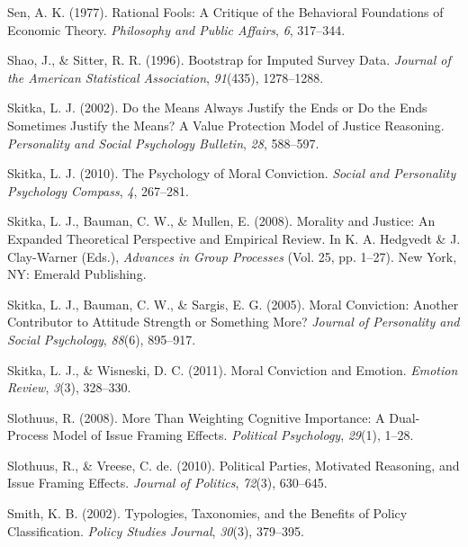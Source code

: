 \documentclass[12pt,econ]{sources/authesis}
\begin{document}
\leavevmode\hypertarget{ref-sen_rational_1977}{}%
Sen, A. K. (1977). Rational Fools: A Critique of the Behavioral Foundations of Economic Theory. \emph{Philosophy and Public Affairs}, \emph{6}, 317--344.

\leavevmode\hypertarget{ref-shao_1996_bootstrap}{}%
Shao, J., \& Sitter, R. R. (1996). Bootstrap for Imputed Survey Data. \emph{Journal of the American Statistical Association}, \emph{91}(435), 1278--1288.

\leavevmode\hypertarget{ref-skitka_2002_means}{}%
Skitka, L. J. (2002). Do the Means Always Justify the Ends or Do the Ends Sometimes Justify the Means? A Value Protection Model of Justice Reasoning. \emph{Personality and Social Psychology Bulletin}, \emph{28}, 588--597.

\leavevmode\hypertarget{ref-skitka_psychology_2010}{}%
Skitka, L. J. (2010). The Psychology of Moral Conviction. \emph{Social and Personality Psychology Compass}, \emph{4}, 267--281.

\leavevmode\hypertarget{ref-skitka_2008_morality}{}%
Skitka, L. J., Bauman, C. W., \& Mullen, E. (2008). Morality and Justice: An Expanded Theoretical Perspective and Empirical Review. In K. A. Hedgvedt \& J. Clay-Warner (Eds.), \emph{Advances in Group Processes} (Vol. 25, pp. 1--27). New York, NY: Emerald Publishing.

\leavevmode\hypertarget{ref-skitka_moral_2005}{}%
Skitka, L. J., Bauman, C. W., \& Sargis, E. G. (2005). Moral Conviction: Another Contributor to Attitude Strength or Something More? \emph{Journal of Personality and Social Psychology}, \emph{88}(6), 895--917.

\leavevmode\hypertarget{ref-skitka_moral_2011}{}%
Skitka, L. J., \& Wisneski, D. C. (2011). Moral Conviction and Emotion. \emph{Emotion Review}, \emph{3}(3), 328--330.

\leavevmode\hypertarget{ref-slothuus_more_2008}{}%
Slothuus, R. (2008). More Than Weighting Cognitive Importance: A Dual-Process Model of Issue Framing Effects. \emph{Political Psychology}, \emph{29}(1), 1--28.

\leavevmode\hypertarget{ref-slothuus_political_2010}{}%
Slothuus, R., \& Vreese, C. de. (2010). Political Parties, Motivated Reasoning, and Issue Framing Effects. \emph{Journal of Politics}, \emph{72}(3), 630--645.

\leavevmode\hypertarget{ref-smith_typologies_2002}{}%
Smith, K. B. (2002). Typologies, Taxonomies, and the Benefits of Policy Classification. \emph{Policy Studies Journal}, \emph{30}(3), 379--395.
\end{document}
